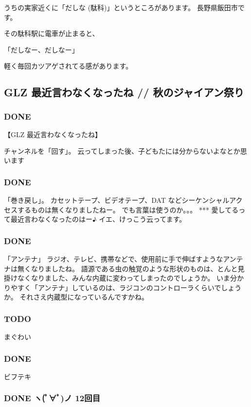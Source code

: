 \documentclass[11pt]{article}
\begin{document}
うちの実家近くに「だしな (駄科)」というところがあります。
長野県飯田市です。

その駄科駅に電車が止まると、

  「だしなー、だしなー」

軽く毎回カツアゲされてる感があります。
\subsection{GLZ 最近言わなくなったね // 秋のジャイアン祭り}
\label{sec-62_2}
\subsubsection{\textbf{DONE}}
\label{sec-62_2_1}

【GLZ 最近言わなくなったね】

チャンネルを「回す」。
云ってしまった後、子どもたには分からないよなとか思います
\subsubsection{\textbf{DONE}}
\label{sec-62_2_2}

「巻き戻し」。
カセットテープ、ビデオテープ、DAT
などシーケンシャルアクセスするものは無くなりましたねー。
でも言葉は使うのか。。。
***
愛してるって最近言わなくなったのはー♪
イエ、けっこう云ってます。
\subsubsection{\textbf{DONE}}
\label{sec-62_2_3}

「アンテナ」
ラジオ、テレビ、携帯などで、使用前に手で伸ばすようなアンテナは無くなりましたね。
語源である虫の触覚のような形状のものは、とんと見掛けなくなりました、みんな内蔵に変わってしまったのでしょうか。
いま分かりやすく「アンテナ」しているのは、ラジコンのコントローラくらいでしょうか。
それさえ内蔵型になっているんですかね。
\subsubsection{\textbf{TODO}}
\label{sec-62_2_4}

まぐわい
\subsubsection{\textbf{DONE}}
\label{sec-62_2_5}

ビフテキ
\subsubsection{\textbf{DONE} ヽ(ﾟ∀ﾟ)ノ 12回目}
\label{sec-62_2_6}
\end{document}
